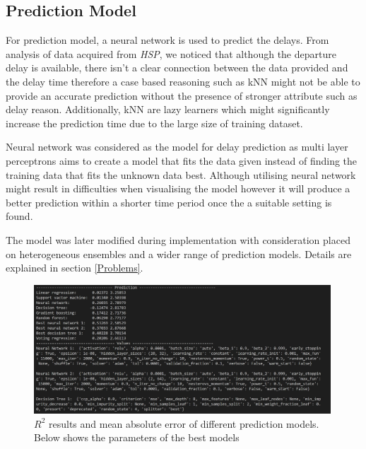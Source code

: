 \documentclass[11pt]{article}
\begin{document}
\subsection{Prediction Model}
For prediction model, a neural network is used to predict the delays. From analysis of data acquired from \textit{HSP}, we noticed that although the departure delay is available, there isn't a clear connection between the data provided and the delay time therefore a case based reasoning such as kNN might not be able to provide an accurate prediction without the presence of stronger attribute such as delay reason. Additionally, kNN are lazy learners which might significantly increase the prediction time due to the large size of training dataset.

Neural network was considered as the model for delay prediction as multi layer perceptrons aims to create a model that fits the data given instead of finding the training data that fits the unknown data best. Although utilising neural network might result in difficulties when visualising the model however it will produce a better prediction within a shorter time period once the a suitable setting is found.

The model was later modified during implementation with consideration placed on heterogeneous ensembles and a wider range of prediction models. Details are explained in section \ref{Problems}.

\begin{figure}[!htb]
	\centering
	\includegraphics[width=0.99\textwidth]{Prediction}
	\caption{$R^2$ results and mean absolute error of different prediction models. Below shows the parameters of the best models}\label{fig:Prediction}
\end{figure}
\end{document}
